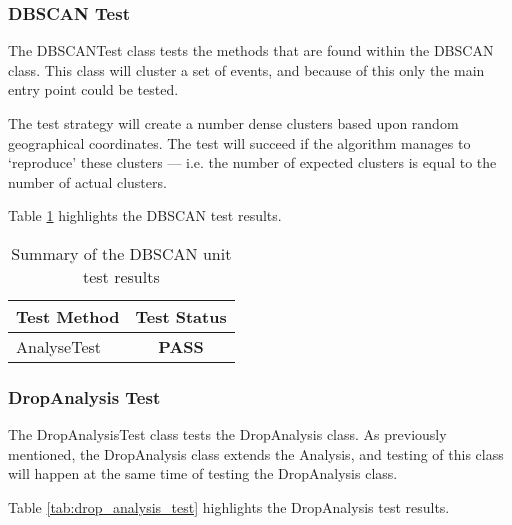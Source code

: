 \subsubsection{DBSCAN Test}

The {\ttfamily DBSCANTest} class tests the methods that are found within the 
DBSCAN class. This class will cluster a set of events, and because of this 
only the main entry point could be tested.

The test strategy will create a number dense clusters based upon random 
geographical coordinates. The test will succeed if the algorithm manages to 
`reproduce' these clusters --- i.e. the number of expected clusters is equal to
the number of actual clusters.

Table \ref{tab:dbscan_test} highlights the DBSCAN test results.

\begin{table}[h]
  \centering
  \begin{tabular}{|l|c|}
    \hline
    {\bfseries Test Method} & {\bfseries Test Status} \\ 
    \hline
    AnalyseTest             & {\bfseries \color{OliveGreen} PASS} \\
    \hline
  \end{tabular}
  \caption[Summary of the DBSCAN unit test results]
          {Summary of the DBSCAN unit test results}
  \label{tab:dbscan_test}
\end{table}


\subsubsection{DropAnalysis Test}
The {\ttfamily DropAnalysisTest} class tests the {\ttfamily DropAnalysis} 
class. As previously mentioned, the {\ttfamily DropAnalysis} class extends the
{\ttfamily Analysis}, and testing of this class will happen at the same time of
testing the {\ttfamily DropAnalysis} class.

Table \ref{tab:drop_analysis_test} highlights the DropAnalysis test results.

